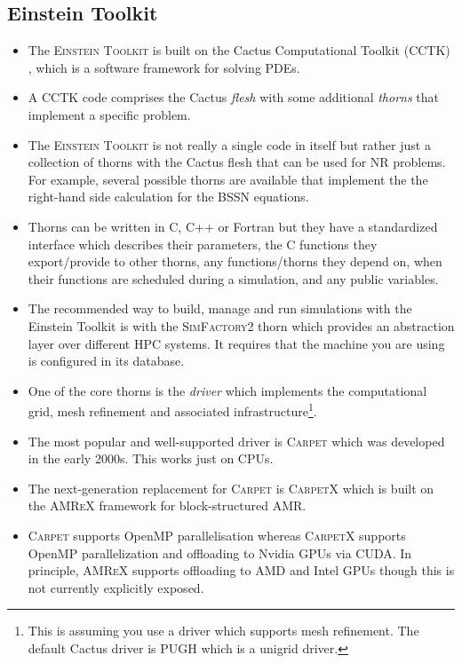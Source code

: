 \documentclass[12pt,a4paper]{article}
\numberwithin{figure}{subsection}
\newcommand{\einsteintoolkit}{\textsc{Einstein Toolkit}\xspace}
\newcommand{\amrex}{\textsc{AMReX}\xspace}
\newcommand{\carpet}{\textsc{Carpet}\xspace}
\newcommand{\carpetx}{\textsc{CarpetX}\xspace}
\begin{document}
\subsection{Einstein Toolkit}
\begin{itemize}
    \item The \einsteintoolkit is built on the Cactus Computational Toolkit
    (CCTK) \cite{Goodale2002a}, which is a software framework for solving PDEs.
    \item A CCTK code comprises the Cactus \emph{flesh} with some additional
    \emph{thorns} that implement a specific problem.
    \item The \einsteintoolkit is not really a single code in itself but rather
    just a collection of thorns with the Cactus flesh that can be used for NR
    problems. For example, several possible thorns are available that implement
    the the right-hand side calculation for the BSSN equations.
    \item Thorns can be written in C, C++ or Fortran but they have a
    standardized interface which describes their parameters, the C functions
    they export/provide to other thorns, any functions/thorns they depend on,
    when their functions are scheduled during a simulation, and any public
    variables.
    \item The recommended way to build, manage and run simulations with the
    Einstein Toolkit is with the \textsc{SimFactory2} thorn which provides an
    abstraction layer over different HPC systems. It requires that the machine
    you are using is configured in its database.
    \item One of the core thorns is the \emph{driver} which implements the
    computational grid, mesh refinement and associated
    infrastructure\footnote{This is assuming you use a driver which supports
    mesh refinement. The default Cactus driver is PUGH which is a unigrid
    driver.}.
    \item The most popular and well-supported driver is \carpet
    \cite{Schnetter:2003rb} which was developed in the early 2000s. This works just on CPUs.
    \item The next-generation replacement for \carpet is \carpetx
    \cite{Shankar:2022ful} which is built on the \amrex
    \cite{Zhang:2019a,Zhang:2021a} framework for block-structured AMR.
    \item \carpet supports OpenMP parallelisation whereas \carpetx supports
    OpenMP parallelization and offloading to Nvidia GPUs via CUDA. In principle,
    \amrex supports offloading to AMD and Intel GPUs though this is not
    currently explicitly exposed.
\end{itemize}
\end{document}
